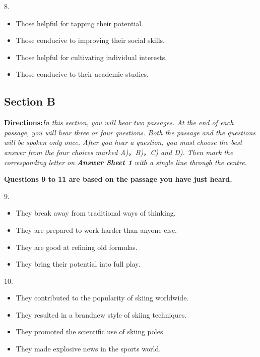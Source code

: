 \documentclass[UTF8,11pt]{ctexart}
\begin{document}
8.


\begin{itemize}[leftmargin=2em,itemsep=.2em,topsep=.4em]\item[A.] Those helpful for tapping their potential.
\item[B.] Those conducive to improving their social skills.
\item[C.] Those helpful for cultivating individual interests.
\item[D.] Those conducive to their academic studies.
\end{itemize}

\subsection*{\textbf{Section B}}


\textbf{Directions:}\textit{In this section, you will hear two passages. At the end of each passage, you will hear three or four} \textit{questions. Both the passage and the questions will be spoken only once. After you hear a question, you must} \textit{choose the best answer from the four choices marked A)}，\textit{B)}，\textit{C) and D). Then mark the corresponding letter on} \textbf{\textit{Answer Sheet 1}}\textit{ with a single line through the centre.}


\textbf{Questions 9 to 11 are based on the passage you have just heard.}


9.


\begin{itemize}[leftmargin=2em,itemsep=.2em,topsep=.4em]\item[A.] They break away from traditional ways of thinking.
\end{itemize}

\begin{itemize}[leftmargin=2em,itemsep=.2em,topsep=.4em]\item[B.] They are prepared to work harder than anyone else.
\item[C.] They are good at refining old formulas.
\item[D.] They bring their potential into full play.
\end{itemize}

10.


\begin{itemize}[leftmargin=2em,itemsep=.2em,topsep=.4em]\item[A.] They contributed to the popularity of skiing worldwide.
\item[B.] They resulted in a brandnew style of skiing techniques.
\item[C.] They promoted the scientific use of skiing poles.
\item[D.] They made explosive news in the sports world.
\end{itemize}
\end{document}
